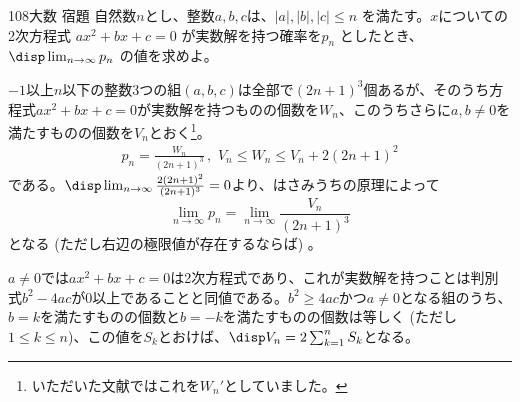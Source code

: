 \begin{thm}{108}{}{大数 宿題}
 自然数$n$とし、整数$a, b, c$は、$|a|, |b|, |c| \le n$ を満たす。$x$についての2次方程式 $ax^2+bx+c=0$ が実数解を持つ確率を$p_n$ としたとき、$\disp \lim_{n\to\infty} p_n$ の値を求めよ。
\end{thm}

$-1$以上$n$以下の整数3つの組$(a, b, c)$は全部で$(2n+1)^3$個あるが、そのうち方程式$ax^2+bx+c=0$が実数解を持つものの個数を$W_n$、このうちさらに$a, b\neq 0$を満たすものの個数を$V_n$とおく\footnote{いただいた文献ではこれを$W_n'$としていました。}。
\begin{align*}
 p_n=\frac{W_n}{(2n+1)^3} \,,\,\, V_n\le W_n \le V_n+2(2n+1)^2
\end{align*}
である。$\disp \lim_{n\to\infty} \frac{2(2n+1)^2}{(2n+1)^3}=0$より、はさみうちの原理によって
\[ \lim_{n\to\infty} p_n=\lim_{n\to\infty} \frac{V_n}{(2n+1)^3} \]
となる (ただし右辺の極限値が存在するならば) 。

$a\neq 0$では$ax^2+bx+c=0$は2次方程式であり、これが実数解を持つことは判別式$b^2-4ac$が0以上であることと同値である。$b^2\ge 4ac$かつ$a\neq 0$となる組のうち、$b=k$を満たすものの個数と$b=-k$を満たすものの個数は等しく (ただし$1\le k\le n$)、この値を$S_k$とおけば、$\disp V_n=2\sum_{k=1}^n S_k$となる。

